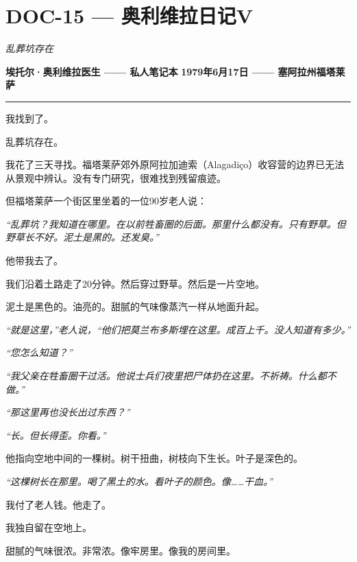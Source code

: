 \section*{\textbf{DOC-15} --- 奥利维拉日记V}

\noindent \textit{乱葬坑存在}

\noindent \textbf{埃托尔·奥利维拉医生 —— 私人笔记本}
\textbf{1979年6月17日 —— 塞阿拉州福塔莱萨}

\vspace{0.5em}\noindent\rule{\textwidth}{0.5pt}\vspace{0.5em}

\noindent 我找到了。

\noindent 乱葬坑存在。

\noindent 我花了三天寻找。福塔莱萨郊外原阿拉加迪索（Alagadiço）收容营的边界已无法从景观中辨认。没有专门研究，很难找到残留痕迹。

\noindent 但福塔莱萨一个街区里坐着的一位90岁老人说：

\noindent \textit{“乱葬坑？我知道在哪里。在以前牲畜圈的后面。那里什么都没有。只有野草。但野草长不好。泥土是黑的。还发臭。”}

\noindent 他带我去了。

\noindent 我们沿着土路走了20分钟。然后穿过野草。然后是一片空地。

\noindent 泥土是黑色的。油亮的。甜腻的气味像蒸汽一样从地面升起。

\noindent \textit{“就是这里，”老人说，“他们把莫兰布多斯埋在这里。成百上千。没人知道有多少。”}

\noindent \textit{“您怎么知道？”}

\noindent \textit{“我父亲在牲畜圈干过活。他说士兵们夜里把尸体扔在这里。不祈祷。什么都不做。”}

\noindent \textit{“那这里再也没长出过东西？”}

\noindent \textit{“长。但长得歪。你看。”}

\noindent 他指向空地中间的一棵树。树干扭曲，树枝向下生长。叶子是深色的。

\noindent \textit{“这棵树长在那里。喝了黑土的水。看叶子的颜色。像……干血。”}

\noindent 我付了老人钱。他走了。

\noindent 我独自留在空地上。

\noindent 甜腻的气味很浓。非常浓。像牢房里。像我的房间里。

